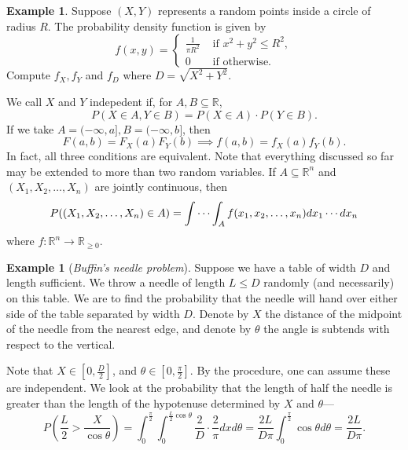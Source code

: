 \documentclass[15pt,a4paper]{book}
\theoremstyle{definition}
\newtheorem{example}[theorem]{Example}
\newcommand{\eax}[1]{\emph{#1}\index{#1}} %
\newcommand{\R}{\mathbb{R}}
\begin{document}
\begin{example}
    Suppose $(X,Y)$ represents a random points inside a circle of radius $R$. The probability density function is given by
    \begin{equation*}
        f(x,y) = \begin{cases}
            \frac{1}{\pi R^{2}} &\text{ if } x^{2}+y^{2} \leq R^{2},\\
            0 &\text{ if otherwise.}
        \end{cases}
    \end{equation*}
    Compute $f_{X},f_{Y}$ and $f_{D}$ where $D = \sqrt{X^{2}+Y^{2}}$.
\end{example}
We call $X$ and $Y$ indepedent if, for $A,B \subseteq \R$,
\begin{equation}
    P(X \in A, Y \in B) = P(X \in A) \cdot P(Y \in B).
\end{equation}
If we take $A = (-\infty, a], B = (-\infty, b]$, then
\begin{equation*}
    F(a,b) = F_{X}(a) F_{Y}(b) \implies f(a,b) = f_{X}(a) f_{Y}(b).
\end{equation*}
In fact, all three conditions are equivalent. Note that everything discussed so far may be extended to more than two random variables. If $A \subseteq \R^{n}$ and $(X_{1},X_{2},\ldots,X_{n})$ are jointly continuous, then
\begin{equation}
    P((X_{1},X_{2},\ldots,X_{n}) \in A) = \idotsint_{A} f(x_{1},x_{2},\ldots,x_{n}) dx_{1} \cdots dx_{n}
\end{equation}
where $f: \R^{n} \to \R_{\geq 0}$.

\begin{example}[\eax{Buffin's needle problem}]
Suppose we have a table of width $D$ and length sufficient. We throw a needle of length $L \leq D$ randomly (and necessarily) on this table. We are to find the probability that the needle will hand over either side of the table separated by width $D$. Denote by $X$ the distance of the midpoint of the needle from the nearest edge, and denote by $\theta$ the angle is subtends with respect to the vertical.

Note that $X \in [0,\frac{D}{2}]$, and $\theta \in [0,\frac{\pi}{2}]$. By the procedure, one can assume these are independent. We look at the probability that the length of half the needle is greater than the length of the hypotenuse determined by $X$ and $\theta$---
\begin{equation}
    P(\frac{L}{2} > \frac{X}{\cos \theta}) = \int_{0}^{\frac{\pi}{2}} \int_{0}^{\frac{L}{2} \cos \theta} \frac{2}{D} \cdot \frac{2}{\pi} dx d\theta = \frac{2L}{D \pi} \int_{0}^{\frac{\pi}{2}} \cos \theta d \theta = \frac{2L}{D \pi}.
\end{equation}
\end{example}
\end{document}
